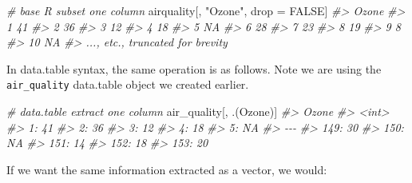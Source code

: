 \documentclass[
]{book}
\newenvironment{Shaded}{\begin{snugshade}}{\end{snugshade}}
\newcommand{\CommentTok}[1]{\textcolor[rgb]{0.56,0.35,0.01}{\textit{#1}}}
\newcommand{\ConstantTok}[1]{\textcolor[rgb]{0.00,0.00,0.00}{#1}}
\newcommand{\NormalTok}[1]{#1}
\newcommand{\OtherTok}[1]{\textcolor[rgb]{0.56,0.35,0.01}{#1}}
\newcommand{\StringTok}[1]{\textcolor[rgb]{0.31,0.60,0.02}{#1}}
\begin{document}
\begin{Shaded}
\begin{Highlighting}[]
\CommentTok{\# base R subset one column }
\NormalTok{airquality[, }\StringTok{"Ozone"}\NormalTok{, drop }\OtherTok{=} \ConstantTok{FALSE}\NormalTok{]}
\CommentTok{\#\textgreater{}     Ozone}
\CommentTok{\#\textgreater{} 1      41}
\CommentTok{\#\textgreater{} 2      36}
\CommentTok{\#\textgreater{} 3      12}
\CommentTok{\#\textgreater{} 4      18}
\CommentTok{\#\textgreater{} 5      NA}
\CommentTok{\#\textgreater{} 6      28}
\CommentTok{\#\textgreater{} 7      23}
\CommentTok{\#\textgreater{} 8      19}
\CommentTok{\#\textgreater{} 9       8}
\CommentTok{\#\textgreater{} 10     NA}
\CommentTok{\#\textgreater{} ..., etc., truncated for brevity}
\end{Highlighting}
\end{Shaded}

In data.table syntax, the same operation is as follows. Note we are using the \texttt{air\_quality} data.table object we created earlier.

\begin{Shaded}
\begin{Highlighting}[]
\CommentTok{\# data.table extract one column }
\NormalTok{air\_quality[, .(Ozone)]}
\CommentTok{\#\textgreater{}      Ozone}
\CommentTok{\#\textgreater{}      \textless{}int\textgreater{}}
\CommentTok{\#\textgreater{}   1:    41}
\CommentTok{\#\textgreater{}   2:    36}
\CommentTok{\#\textgreater{}   3:    12}
\CommentTok{\#\textgreater{}   4:    18}
\CommentTok{\#\textgreater{}   5:    NA}
\CommentTok{\#\textgreater{}  {-}{-}{-}      }
\CommentTok{\#\textgreater{} 149:    30}
\CommentTok{\#\textgreater{} 150:    NA}
\CommentTok{\#\textgreater{} 151:    14}
\CommentTok{\#\textgreater{} 152:    18}
\CommentTok{\#\textgreater{} 153:    20}
\end{Highlighting}
\end{Shaded}

If we want the same information extracted as a vector, we would:
\end{document}
